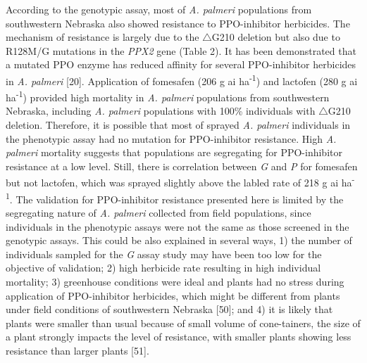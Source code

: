 \documentclass[10pt,letterpaper]{article}
\begin{document}
According to the genotypic assay, most of \emph{A. palmeri} populations
from southwestern Nebraska also showed resistance to PPO-inhibitor
herbicides. The mechanism of resistance is largely due to the
\(\triangle\)G210 deletion but also due to R128M/G mutations in the
\emph{PPX2} gene (Table 2). It has been demonstrated that a mutated PPO
enzyme has reduced affinity for several PPO-inhibitor herbicides in
\emph{A. palmeri} {[}20{]}. Application of fomesafen (206 g ai
ha\textsuperscript{-1}) and lactofen (280 g ai ha\textsuperscript{-1})
provided high mortality in \emph{A. palmeri} populations from
southwestern Nebraska, including \emph{A. palmeri} populations with
100\% individuals with \(\triangle\)G210 deletion. Therefore, it is
possible that most of sprayed \emph{A. palmeri} individuals in the
phenotypic assay had no mutation for PPO-inhibitor resistance. High
\emph{A. palmeri} mortality suggests that populations are segregating
for PPO-inhibitor resistance at a low level. Still, there is correlation
between \emph{G} and \emph{P} for fomesafen but not lactofen, which was
sprayed slightly above the labled rate of 218 g ai
ha\textsuperscript{-1}. The validation for PPO-inhibitor resistance
presented here is limited by the segregating nature of \emph{A. palmeri}
collected from field populations, since individuals in the phenotypic
assays were not the same as those screened in the genotypic assays. This
could be also explained in several ways, 1) the number of individuals
sampled for the \emph{G} assay study may have been too low for the
objective of validation; 2) high herbicide rate resulting in high
individual mortality; 3) greenhouse conditions were ideal and plants had
no stress during application of PPO-inhibitor herbicides, which might be
different from plants under field conditions of southwestern Nebraska
{[}50{]}; and 4) it is likely that plants were smaller than usual
because of small volume of cone-tainers, the size of a plant strongly
impacts the level of resistance, with smaller plants showing less
resistance than larger plants {[}51{]}.
\end{document}
